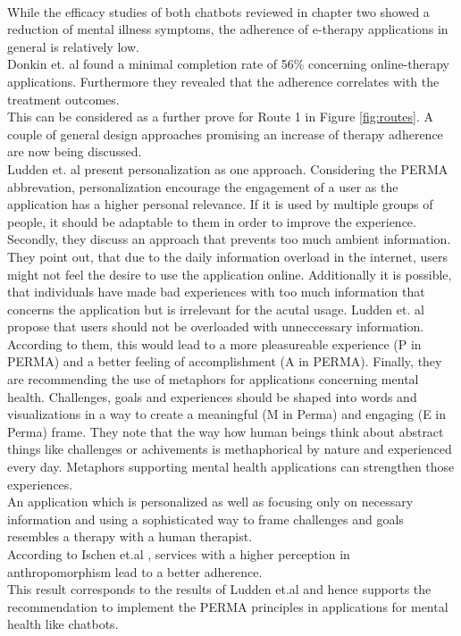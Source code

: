 \documentclass[sigconf, nonacm]{acmart}
\begin{document}
\\
While the efficacy studies of both chatbots reviewed in chapter two showed a reduction of mental illness symptoms, the adherence of e-therapy applications in general is relatively low.
\\
Donkin et. al \cite{Donkina} found a minimal completion rate of 56\% concerning online-therapy applications. Furthermore they revealed that the adherence correlates with the treatment outcomes.
\\This can be considered as a further prove for Route 1 in Figure \ref{fig:routes}.  
A couple of general design approaches promising an increase of therapy adherence are now being discussed.
\\
Ludden et. al \cite{Ludden2015} present personalization as one approach. Considering the PERMA abbrevation, personalization encourage the engagement of a user as the application has a higher personal relevance. If it is used by multiple groups of people, it should be adaptable to them in order to improve the experience.
Secondly, they discuss an approach that prevents too much ambient information. They point out, that due to the daily information overload in the internet, users might not feel the desire to use the
application online. Additionally it is possible, that individuals have made bad experiences with too much information that concerns the application but is irrelevant for the acutal usage. 
Ludden et. al propose that users should not be overloaded with unneccessary information. According to them, this would lead to a more pleasureable experience (P in PERMA) and a better feeling of accomplishment (A in PERMA).
Finally, they are recommending the use of metaphors for applications concerning mental health. Challenges, goals and experiences should be shaped into words and visualizations in a way to create a meaningful (M in Perma) and engaging (E in Perma) frame.
They note that the way how human beings think about abstract things like challenges or achivements is methaphorical by nature and experienced every day. Metaphors supporting mental health applications can strengthen those experiences.
\\
An application which is personalized as well as focusing only on necessary information and using a sophisticated way to frame challenges and goals resembles a therapy with a human therapist.
\\
According to Ischen et.al \cite{Ischen}, services with a higher perception in anthropomorphism lead to a better adherence.
\\
This result corresponds to the results of Ludden et.al and hence supports the recommendation to implement the PERMA principles in applications for mental health like chatbots. 
\\
\end{document}
